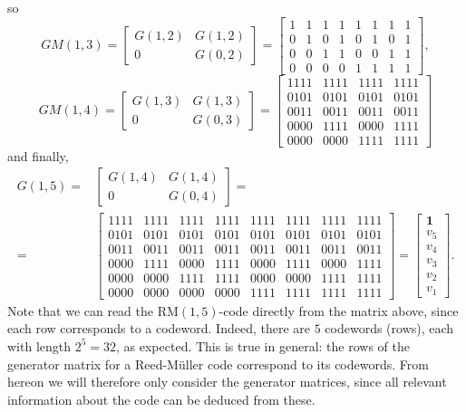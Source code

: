 \documentclass[english,bachelor]{liumaiex}
\begin{document}
so
\begin{displaymath}
GM(1,3)=
\begin{bmatrix}
G(1,2) 	& G(1,2)\\
0		& G(0,2)
\end{bmatrix}
=
\begin{bmatrix}
1 & 1 & 1 & 1 & 1 & 1 & 1 & 1\\
0 & 1 & 0 & 1 & 0 & 1 & 0 & 1\\
0 & 0 & 1 & 1 & 0 & 0 & 1 & 1\\
0 & 0 & 0 & 0 & 1 & 1 & 1 & 1
\end{bmatrix},
\end{displaymath}
\begin{displaymath}
GM(1,4)=
\begin{bmatrix}
G(1,3) 	& G(1,3)\\
0		& G(0,3)
\end{bmatrix}
=
\begin{bmatrix}
1111 & 1111 & 1111 & 1111\\
0101 & 0101 & 0101 & 0101\\
0011 & 0011 & 0011 & 0011\\
0000 & 1111 & 0000 & 1111\\
0000 & 0000 & 1111 & 1111
\end{bmatrix}
\end{displaymath}
and finally,
\begin{align*}
G(1,5)=&
\begin{bmatrix}
G(1,4) 	& G(1,4)\\
0		& G(0,4)
\end{bmatrix}
=\\
=&
\begin{bmatrix}
1111 & 1111 & 1111 & 1111 & 1111 & 1111 & 1111 & 1111\\
0101 & 0101 & 0101 & 0101 & 0101 & 0101 & 0101 & 0101\\
0011 & 0011 & 0011 & 0011 & 0011 & 0011 & 0011 & 0011\\
0000 & 1111 & 0000 & 1111 & 0000 & 1111 & 0000 & 1111\\
0000 & 0000 & 1111 & 1111 & 0000 & 0000 & 1111 & 1111\\
0000 & 0000 & 0000 & 0000 & 1111 & 1111 & 1111 & 1111
\end{bmatrix}
=
\begin{bmatrix}
\mathbf{1}\\
v_5\\
v_4\\
v_3\\
v_2\\
v_1
\end{bmatrix}.
\end{align*}
Note that we can read the $\text{RM}(1,5)$-code directly from the matrix above, since each row corresponds to a codeword. Indeed, there are $5$ codewords (rows), each with length $2^5=32$, as expected. This is true in general: the rows of the generator matrix for a Reed-M{\"u}ller code correspond to its codewords. From hereon we will therefore only consider the generator matrices, since all relevant information about the code can be deduced from these.
\end{document}
